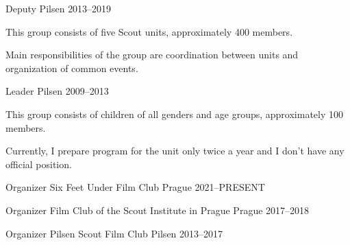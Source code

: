 \begin{cventries}
\cventry
{Deputy} %
{} %
{Pilsen} %
{2013--2019} %
{
  \begin{cvitems} %
    \item {This group consists of five Scout units, approximately 400 members.} 
    \item {Main responsibilities of the group are coordination between units and organization of common events.}
  \end{cvitems}
}

\cventry
{Leader} %
{} %
{Pilsen} %
{2009--2013} %
{
  \begin{cvitems} %
    \item {This group consists of children of all genders and age groups, approximately 100 members.} 
    \item {Currently, I prepare program for the unit only twice a year and I don't have any official position.}
  \end{cvitems}
}


\end{cventries}




\begin{cventries}
  \cventry
    {Organizer} %
    {Six Feet Under Film Club} %
    {Prague} %
    {2021--PRESENT} %
    {}

  \cventry
    {Organizer} %
    {Film Club of the Scout Institute in Prague} %
    {Prague} %
    {2017--2018} %
    {}

  \cventry
    {Organizer} %
    {Pilsen Scout Film Club} %
    {Pilsen} %
    {2013--2017} %
    {}


\end{cventries}

